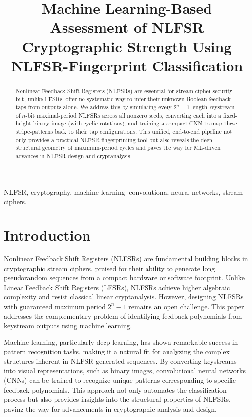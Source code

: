 \documentclass[conference]{IEEEtran}
\title{Machine Learning-Based Assessment of NLFSR Cryptographic Strength Using NLFSR-Fingerprint Classification}
\author{
  \IEEEauthorblockN{Sultan Almuhammadi, Abdulmumin Sa'ad and Mohammed Mansour}
  \IEEEauthorblockA{
    Department of Computer Engineering,\\
    King Fahd University of Petroleum and Minerals,\\
    Dhahran, Saudi Arabia\\
    Email: \{muhamadi, g202203620, g202423860\}@kfupm.edu.sa
  }
}
\begin{document}
\maketitle

\begin{abstract}
Nonlinear Feedback Shift Registers (NLFSRs) are essential for stream-cipher security but, unlike LFSRs, offer no systematic way to infer their unknown Boolean feedback taps from outputs alone. We address this by simulating every $2^{n}-1$-length keystream of $n$-bit maximal-period NLFSRs across all nonzero seeds, converting each into a fixed-height binary image (with cyclic rotations), and training a compact CNN to map these stripe-patterns back to their tap configurations. This unified, end-to-end pipeline not only provides a practical NLFSR-fingerprinting tool but also reveals the deep structural geometry of maximum-period cycles and paves the way for ML-driven advances in NLFSR design and cryptanalysis.
\end{abstract}

\begin{IEEEkeywords}
NLFSR, cryptography, machine learning, convolutional neural networks, stream ciphers.
\end{IEEEkeywords}

\section{Introduction}
Nonlinear Feedback Shift Registers (NLFSRs) are fundamental building blocks in cryptographic stream ciphers, praised for their ability to generate long pseudorandom sequences from a compact hardware or software footprint. Unlike Linear Feedback Shift Registers (LFSRs), NLFSRs achieve higher algebraic complexity and resist classical linear cryptanalysis. However, designing NLFSRs with guaranteed maximum period $2^{n}-1$ remains an open challenge. This paper addresses the complementary problem of identifying feedback polynomials from keystream outputs using machine learning.

Machine learning, particularly deep learning, has shown remarkable success in pattern recognition tasks, making it a natural fit for analyzing the complex structures inherent in NLFSR-generated sequences. By converting keystreams into visual representations, such as binary images, convolutional neural networks (CNNs) can be trained to recognize unique patterns corresponding to specific feedback polynomials. This approach not only automates the classification process but also provides insights into the structural properties of NLFSRs, paving the way for advancements in cryptographic analysis and design.
\end{document}

